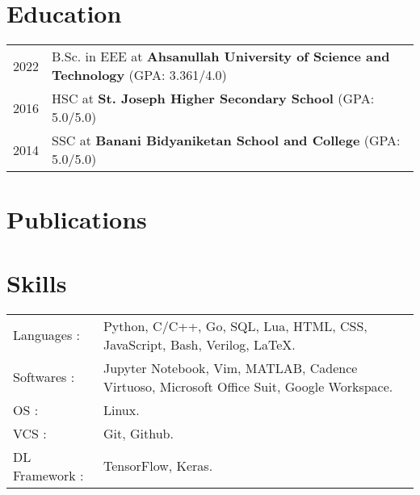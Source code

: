 \documentclass[a4paper,12pt]{article}
\begin{document}


\section{Education}
\begin{tabularx}{\linewidth}{@{}l X@{}}	
2022 & B.Sc. in EEE at \textbf{Ahsanullah University of Science and Technology} \hfill (GPA: 3.361/4.0) \\ 

2016 & HSC at \textbf{St. Joseph Higher Secondary School}  \hfill  (GPA: 5.0/5.0) \\

2014 & SSC at \textbf{Banani Bidyaniketan School and College}  \hfill  (GPA: 5.0/5.0) \\
\end{tabularx}



\section{Publications}
\begin{refsection}
\nocite{*}
\printbibliography[heading=none]
\end{refsection}



\section{Skills}
\begin{tabularx}{\linewidth}{@{}l X@{}}
Languages : &  \normalsize{Python, C/C++, Go, SQL, Lua, HTML, CSS, JavaScript, Bash, Verilog, \LaTeX.}\\
Softwares : &  \normalsize{Jupyter Notebook, Vim, MATLAB, Cadence Virtuoso, Microsoft Office Suit, Google Workspace.}\\  
OS :  &  \normalsize{Linux.}\\ 
VCS : &  \normalsize{Git, Github.}\\
DL Framework : & \normalsize{TensorFlow, Keras.}\\
\end{tabularx}
\end{document}
